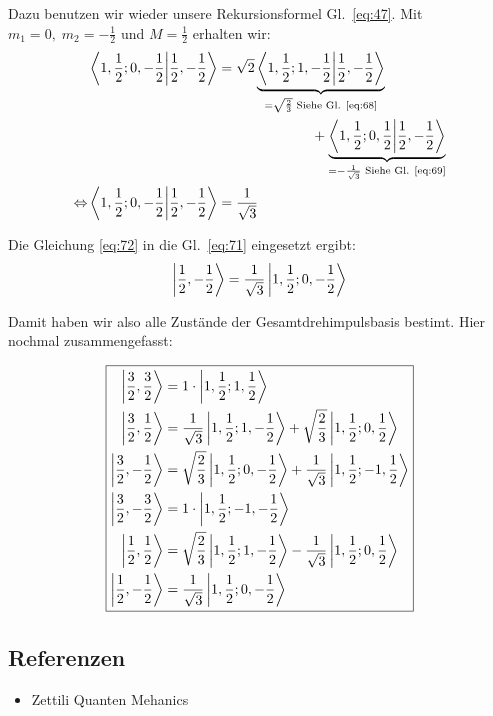 Dazu benutzen wir wieder unsere Rekursionsformel Gl.~\eqref{eq:47}. Mit
\(m_1=0,\; m_2=-\frac 1 2\) und \(M=\frac 1 2\) erhalten wir:
\begin{align}
  \label{eq:72}
  &\braket{1,\frac 1 2;0,-\frac 1 2}{\frac 1 2,-\frac 1 2 }
 =\sqrt 2 \underbrace{
    \braket{1, \frac 1 2; 1, -\frac 1 2}{\frac 1 2,-\frac 1 2}}
  _{=\sqrt{\frac 2 3} \text{ Siehe Gl. \eqref{eq:68}}}\notag\\
  &\qquad\qquad\qquad\qquad\qquad\qquad\qquad\qquad+\underbrace{
    \braket{1, \frac 1 2; 0, \frac 1 2}{\frac 1 2,-\frac 1 2}}
  _{=-\frac 1 {\sqrt 3} \text{ Siehe Gl. \eqref{eq:69}}}\notag\\
 \Leftrightarrow &\braket{1, \frac 1 2; 0, -\frac 1 2}{\frac 1 2,-\frac 1 2}
 = \frac 1  {\sqrt 3} 
\end{align}

Die Gleichung \eqref{eq:72} in die Gl.~\eqref{eq:71} eingesetzt ergibt:
\begin{equation}
  \label{eq:73}
   \left| \frac 1 2,-\frac 1 2 \right\rangle=\frac 1  {\sqrt 3} \left| 1,\frac 1 2;0,-\frac 1 2 \right\rangle
\end{equation}

Damit haben wir also alle Zustände der Gesamtdrehimpulsbasis bestimt. Hier
nochmal zusammengefasst:

\[\boxed{
\begin{aligned}
  \left| \frac 3 2,\frac 3 2 \right\rangle&=1\cdot\left| 1,\frac 1 2;1,\frac 1 2 \right\rangle\\
  \left| \frac 3 2, \frac 1 2 \right\rangle&= 
     \frac 1 {\sqrt 3}
     \left| 1, \frac 1 2; 1, -\frac 1 2 \right\rangle
     +\sqrt {\frac 2 3} 
     \left| 1, \frac 1 2; 0, \frac 1 2 \right\rangle\\
  \left| \frac 3 2, -\frac 1 2 \right\rangle&=
     \sqrt{\frac 2 3}
     \left| 1, \frac 1 2; 0, -\frac 1 2 \right\rangle
     +\frac 1 {\sqrt 3}
     \left| 1, \frac 1 2; -1, \frac 1 2 \right\rangle\\
  \left| \frac 3 2, -\frac 3 2 \right\rangle&= 1\cdot\left| 1,\frac 1 2;-1,-\frac 1 2 \right\rangle\\
  \left| \frac 1 2, \frac 1 2 \right\rangle&=\sqrt{\frac 2 3}\left| 1,\frac 1 2;1,-\frac 1 2 \right\rangle
   -\frac 1 {\sqrt 3}\left| 1,\frac 1 2;0,\frac 1 2 \right\rangle\\
  \left| \frac 1 2,-\frac 1 2 \right\rangle&=\frac 1  {\sqrt 3} \left| 1,\frac 1 2;0,-\frac 1 2 \right\rangle
\end{aligned}}\]





\subsection*{Referenzen}
\begin{itemize}
\item Zettili Quanten Mehanics
\end{itemize}


